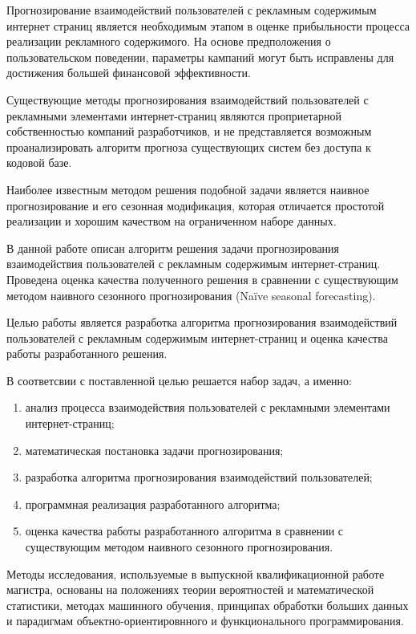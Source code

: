 \documentclass[a4paper, 14pt, oneside]{extarticle}
\begin{document}
    Прогнозирование взаимодействий пользователей с рекламным содержимым интернет страниц является необходимым этапом
    в оценке прибыльности процесса реализации рекламного содержимого. На основе предположения о 
    пользовательском поведении, параметры кампаний могут быть исправлены для достижения большей
    финансовой эффективности.

    Существующие методы прогнозирования взаимодействий пользователей с рекламными элементами
    интернет-страниц являются проприетарной собственностью компаний разработчиков, и не представляется
    возможным проанализировать алгоритм прогноза существующих систем без доступа к кодовой базе.

    Наиболее известным методом решения подобной задачи является наивное прогнозирование и его сезонная
    модификация, которая отличается простотой реализации и хорошим качеством на ограниченном наборе
    данных. 

    В данной работе описан алгоритм решения задачи прогнозирования взаимодействия пользователей с рекламным 
    содержимым интернет-страниц. Проведена оценка качества полученного решения в сравнении с существующим методом
    наивного сезонного прогнозирования (Na\"{i}ve seasonal forecasting). 

    Целью работы является разработка алгоритма прогнозирования взаимодействий пользователей с рекламным содержимым
    интернет-страниц и оценка качества работы разработанного решения.

    В соответсвии с поставленной целью решается набор задач, а именно:
    \begin{enumerate}
        \item анализ процесса взаимодействия пользователей с рекламными элементами интернет-страниц;
        \item математическая постановка задачи прогнозирования;
        \item разработка алгоритма прогнозирования взаимодействий пользователей;
        \item программная реализация разработанного алгоритма;
        \item оценка качества работы разработанного алгоритма в сравнении с существующим 
        методом наивного сезонного прогнозирования.
    \end{enumerate}

    Методы исследования, используемые в выпускной квалификационной работе магистра, основаны на положениях
    теории вероятностей и математической статистики, методах машинного обучения, принципах обработки больших данных
    и парадигмам объектно-ориентировнного и функционального программирования.
\end{document}
